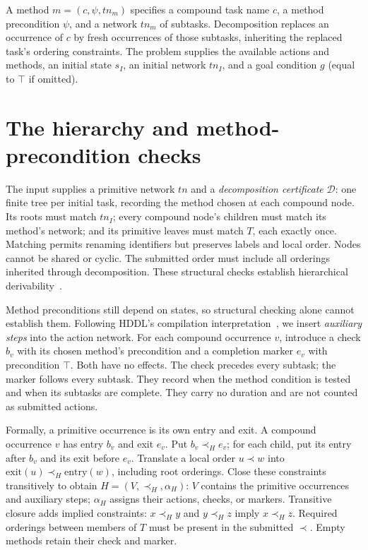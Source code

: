 \documentclass[10pt,a4paper,twocolumn]{article}
\begin{document}
A method $m=(c,\psi,tn_m)$ specifies a compound task name $c$, a method precondition $\psi$, and a network $tn_m$ of subtasks. Decomposition replaces an occurrence of $c$ by fresh occurrences of those subtasks, inheriting the replaced task's ordering constraints. The problem supplies the available actions and methods, an initial state $s_I$, an initial network $tn_I$, and a goal condition $g$ (equal to $\top$ if omitted).

\section{The hierarchy and method-precondition checks}
The input supplies a primitive network $tn$ and a \emph{decomposition certificate} $\mathcal D$: one finite tree per initial task, recording the method chosen at each compound node. Its roots must match $tn_I$; every compound node's children must match its method's network; and its primitive leaves must match $T$, each exactly once. Matching permits renaming identifiers but preserves labels and local order. Nodes cannot be shared or cyclic. The submitted order must include all orderings inherited through decomposition. These structural checks establish hierarchical derivability~\cite{behnke}.

Method preconditions still depend on states, so structural checking alone cannot establish them. Following HDDL's compilation interpretation~\cite{hddl}, we insert \emph{auxiliary steps} into the action network. For each compound occurrence $v$, introduce a check $b_v$ with its chosen method's precondition and a completion marker $e_v$ with precondition $\top$. Both have no effects. The check precedes every subtask; the marker follows every subtask. They record when the method condition is tested and when its subtasks are complete. They carry no duration and are not counted as submitted actions.

Formally, a primitive occurrence is its own entry and exit. A compound occurrence $v$ has entry $b_v$ and exit $e_v$. Put $b_v\prec_H e_v$; for each child, put its entry after $b_v$ and its exit before $e_v$. Translate a local order $u\prec w$ into $\mathrm{exit}(u)\prec_H\mathrm{entry}(w)$, including root orderings. Close these constraints transitively to obtain $H=(V,\prec_H,\alpha_H)$: $V$ contains the primitive occurrences and auxiliary steps; $\alpha_H$ assigns their actions, checks, or markers. Transitive closure adds implied constraints: $x\prec_H y$ and $y\prec_H z$ imply $x\prec_H z$. Required orderings between members of $T$ must be present in the submitted $\prec$. Empty methods retain their check and marker.
\end{document}
